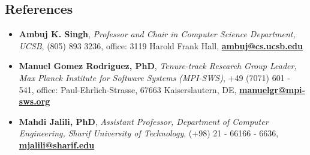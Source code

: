 \documentclass[letter]{res}
\begin{document}
\begin{resume}
\section{References}
\begin{itemize}[leftmargin=-.1in]
\item \textbf{Ambuj K. Singh}, \textit{Professor and Chair in Computer
Science Department, UCSB}, (805) 893 3236, office: 3119 Harold Frank Hall, \href{mailto:manuelgr@mpi-sws.org}{\textbf{ambuj@cs.ucsb.edu}}

\item \textbf{Manuel Gomez Rodriguez, PhD}, \textit{Tenure-track Research Group
Leader, Max Planck Institute for Software Systems (MPI-SWS)}, +49 (7071)
601 - 541, office: Paul-Ehrlich-Strasse, 67663 Kaiserslautern, DE, \href{mailto:manuelgr@mpi-sws.org}{\textbf{manuelgr@mpi-sws.org}}

\item \textbf{Mahdi Jalili, PhD}, \textit{Assistant Professor, Department of Computer Engineering, Sharif University of Technology}, (+98) 21 - 66166 - 6636, \href{mailto: mjalili@sharif.edu}{\textbf{mjalili@sharif.edu}}\\
\end{itemize}
\centerline{}

\end{resume}
\end{document}
